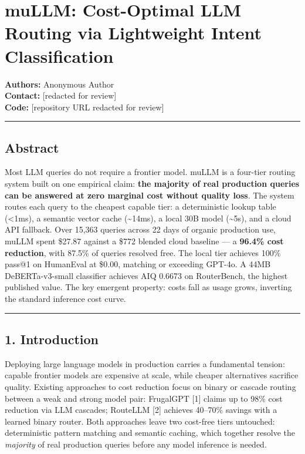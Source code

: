 \section{muLLM: Cost-Optimal LLM Routing via Lightweight Intent Classification}\label{mullm-cost-optimal-llm-routing-via-lightweight-intent-classification}

\textbf{Authors:} Anonymous Author\\
\textbf{Contact:} {[}redacted for review{]}\\
\textbf{Code:} {[}repository URL redacted for review{]}

\begin{center}\rule{0.5\linewidth}{0.5pt}\end{center}

\subsection{Abstract}\label{abstract}

Most LLM queries do not require a frontier model. muLLM is a four-tier routing system built on one empirical claim: \textbf{the majority of real production queries can be answered at zero marginal cost without quality loss}. The system routes each query to the cheapest capable tier: a deterministic lookup table (\textless1ms), a semantic vector cache (\textasciitilde14ms), a local 30B model (\textasciitilde5s), and a cloud API fallback. Over 15,363 queries across 22 days of organic production use, muLLM spent \$27.87 against a \$772 blended cloud baseline --- a \textbf{96.4\% cost reduction}, with 87.5\% of queries resolved free. The local tier achieves 100\% pass@1 on HumanEval at \$0.00, matching or exceeding GPT-4o. A 44MB DeBERTa-v3-small classifier achieves AIQ 0.6673 on RouterBench, the highest published value. The key emergent property: costs fall as usage grows, inverting the standard inference cost curve.

\begin{center}\rule{0.5\linewidth}{0.5pt}\end{center}

\subsection{1. Introduction}\label{introduction}

Deploying large language models in production carries a fundamental tension: capable frontier models are expensive at scale, while cheaper alternatives sacrifice quality. Existing approaches to cost reduction focus on binary or cascade routing between a weak and strong model pair: FrugalGPT {[}1{]} claims up to 98\% cost reduction via LLM cascades; RouteLLM {[}2{]} achieves 40--70\% savings with a learned binary router. Both approaches leave two cost-free tiers untouched: deterministic pattern matching and semantic caching, which together resolve the \emph{majority} of real production queries before any model inference is needed.

